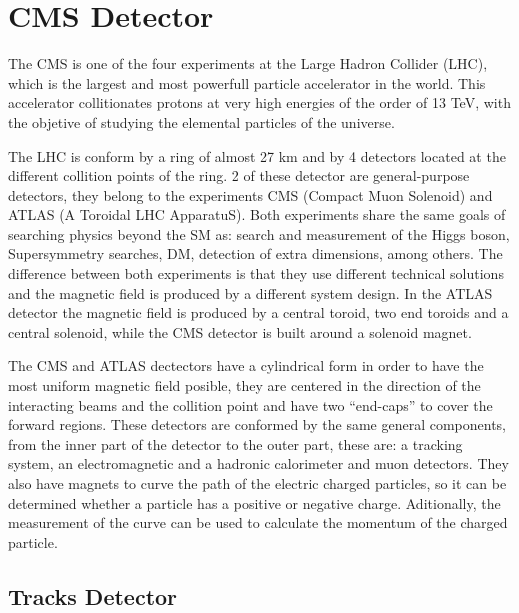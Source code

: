\chapter{CMS Detector}

The CMS is one of the four experiments at the Large Hadron Collider (LHC), which is the largest and most powerfull particle accelerator in the world. This accelerator collitionates protons at very high energies of the order of 13 TeV, with the objetive of studying the elemental particles of the universe. 

The LHC is conform by a ring of almost 27 km and by 4 detectors located at the different collition points of the ring. 2 of these detector are general-purpose detectors, they belong to the experiments CMS (Compact Muon Solenoid) and ATLAS (A Toroidal LHC ApparatuS). Both experiments share the same goals of searching physics beyond the SM as: search and measurement of the Higgs boson, Supersymmetry searches, DM, detection of extra dimensions, among others. The difference between both experiments is that they use different technical solutions and the magnetic field is produced by a different system design. In the ATLAS detector the magnetic field is produced by a central toroid, two end toroids and a central solenoid, while the CMS detector is built around a solenoid magnet.  

The CMS and ATLAS dectectors have a cylindrical form in order to have the most uniform magnetic field posible, they are centered in the direction of the interacting beams and the collition point and have two ``end-caps'' to cover the forward regions. These detectors are conformed by the same general components, from the inner part of the detector to the outer part, these are: a tracking system, an electromagnetic and a hadronic calorimeter and muon detectors. They also have magnets to curve the path of the electric charged particles, so it can be determined whether a particle has a positive or negative charge. Aditionally, the measurement of the curve can be used to calculate the momentum of the charged particle.



\section{Tracks Detector}

